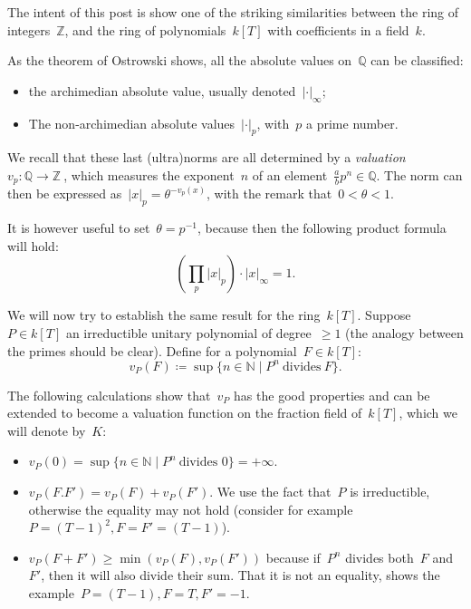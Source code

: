 The intent of this post is show one of the striking similarities between the ring of integers~$\mathbb{Z}$, and the ring of polynomials~$k[T]$ with coefficients in a field~$k$.

As the theorem of Ostrowski shows, all the absolute values on~$\mathbb{Q}$ can be classified:
\begin{itemize}
  \item the archimedian absolute value, usually denoted~$|\cdot|_\infty$;
  \item The non-archimedian absolute values~$|\cdot|_p$, with~$p$ a prime number.
\end{itemize}

We recall that these last (ultra)norms are all determined by a \emph{valuation}~$v_p\colon \mathbb{Q} \to \mathbb{Z}~$, which measures the exponent~$n$ of an element~$\frac{a}{b}p^n \in \mathbb{Q}$. The norm can then be expressed as~$ |x|_p = \theta^{-v_p(x)}$, with the remark that~$0<\theta<1$.

It is however useful to set~$\theta = p^{-1}$, because then the following product formula will hold:
\begin{equation}
  \left( \prod_p |x |_p \right) \cdot |x|_\infty = 1.
\end{equation}

We will now try to establish the same result for the ring~$k[T]$. Suppose~$P \in k[T]$ an irreductible unitary polynomial of degree~$\geq 1$ (the analogy between the primes should be clear). Define for a polynomial~$F \in k[T]$:
\begin{equation}
  v_P(F)\coloneqq \sup \{ n \in \mathbb{N} \mid P^n \ \text{divides} \ F \} .
\end{equation}

The following calculations show that~$v_P$ has the good properties and can be extended to become a valuation function on the fraction field of~$k[T]$, which we will denote by~$K$:
\begin{itemize}
  \item $v_P(0) = \sup\{ n\in \mathbb{N} \mid P^n \ \text{divides } 0 \} = +\infty$.
  \item $v_P(F.F') = v_P(F) + v_P(F')$. We use the fact that~$P$ is irreductible, otherwise the equality may not hold (consider for example~$P = (T-1)^2, F = F' = (T - 1)$).
  \item $v_P(F + F') \geq \min(v_P(F), v_P(F'))$ because if~$P^n$ divides both~$F$ and~$F'$, then it will also divide their sum. That it is not an equality, shows the example~$P = (T - 1), F = T, F' = -1$.
\end{itemize}

